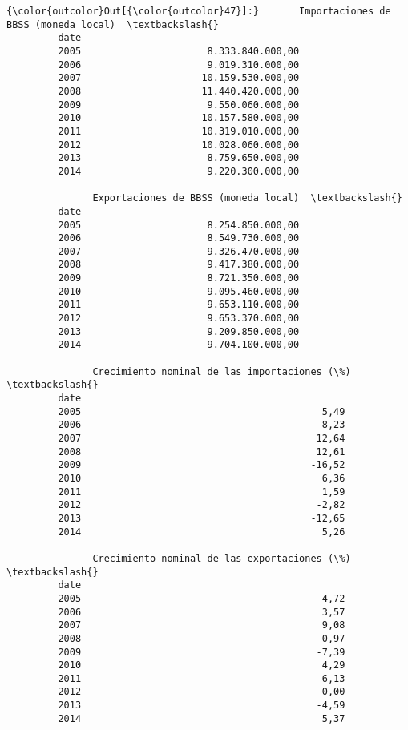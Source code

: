 \documentclass[11pt]{article}
\begin{document}
            \begin{Verbatim}[commandchars=\\\{\}]
{\color{outcolor}Out[{\color{outcolor}47}]:}       Importaciones de BBSS (moneda local)  \textbackslash{}
         date                                         
         2005                      8.333.840.000,00   
         2006                      9.019.310.000,00   
         2007                     10.159.530.000,00   
         2008                     11.440.420.000,00   
         2009                      9.550.060.000,00   
         2010                     10.157.580.000,00   
         2011                     10.319.010.000,00   
         2012                     10.028.060.000,00   
         2013                      8.759.650.000,00   
         2014                      9.220.300.000,00   
         
               Exportaciones de BBSS (moneda local)  \textbackslash{}
         date                                         
         2005                      8.254.850.000,00   
         2006                      8.549.730.000,00   
         2007                      9.326.470.000,00   
         2008                      9.417.380.000,00   
         2009                      8.721.350.000,00   
         2010                      9.095.460.000,00   
         2011                      9.653.110.000,00   
         2012                      9.653.370.000,00   
         2013                      9.209.850.000,00   
         2014                      9.704.100.000,00   
         
               Crecimiento nominal de las importaciones (\%)  \textbackslash{}
         date                                                 
         2005                                          5,49   
         2006                                          8,23   
         2007                                         12,64   
         2008                                         12,61   
         2009                                        -16,52   
         2010                                          6,36   
         2011                                          1,59   
         2012                                         -2,82   
         2013                                        -12,65   
         2014                                          5,26   
         
               Crecimiento nominal de las exportaciones (\%)  \textbackslash{}
         date                                                 
         2005                                          4,72   
         2006                                          3,57   
         2007                                          9,08   
         2008                                          0,97   
         2009                                         -7,39   
         2010                                          4,29   
         2011                                          6,13   
         2012                                          0,00   
         2013                                         -4,59   
         2014                                          5,37   
         

\end{Verbatim}
\end{document}

